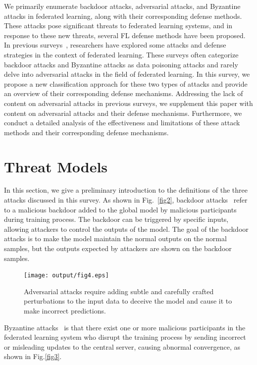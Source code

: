 We primarily enumerate backdoor attacks, adversarial
attacks, and Byzantine attacks in federated learning, along
with their corresponding defense methods. These attacks
pose significant threats to federated learning systems,
and in response to these new threats, several FL defense
methods have been proposed. In previous surveys~\cite{guo2021robust,enthoven2021overview,rodriguez2023survey,tariq2023trustworthy,zhang2023survey}, researchers have explored some attacks and defense
strategies in the context of federated learning. These
surveys often categorize backdoor attacks and Byzantine
attacks as data poisoning attacks and rarely delve into
adversarial attacks in the field of federated learning. In
this survey, we propose a new classification approach for
these two types of attacks and provide an overview of their
corresponding defense mechanisms. Addressing the lack
of content on adversarial attacks in previous surveys, we
supplement this paper with content on adversarial attacks
and their defense mechanisms. Furthermore, we conduct
a detailed analysis of the effectiveness and limitations
of these attack methods and their corresponding defense
mechanisms.

\section{Threat Models} 
In this section, we give a preliminary introduction to the
definitions of the three attacks discussed in this survey.
As shown in Fig.~\ref{fig2}, backdoor attacks~\cite{bagdasaryan2020backdoor,wang2020attack,gong2022backdoor,sun2019can,ozdayi2021defending} refer to a
malicious backdoor added to the global model by malicious
participants during training process. The backdoor can be
triggered by specific inputs, allowing attackers to control
the outputs of the model. The goal of the backdoor attacks
is to make the model maintain the normal outputs on the normal samples, but the outputs expected by attackers
are shown on the backdoor samples. 

\begin{figure}[h]
    \centering
    \texttt{[image: output/fig4.eps]}
     \caption{Adversarial attacks require adding subtle and carefully
     crafted perturbations to the input data to deceive the model and
     cause it to make incorrect predictions.}
     \label{fig4}
\end{figure}

Byzantine attacks~\cite{fang2020local,guo2021byzantine,prakash2020mitigating} is that there exist one
or more malicious participants in the federated learning
system who disrupt the training process by sending
incorrect or misleading updates to the central server, causing
abnormal convergence, as shown in Fig.\ref{fig3}. 






